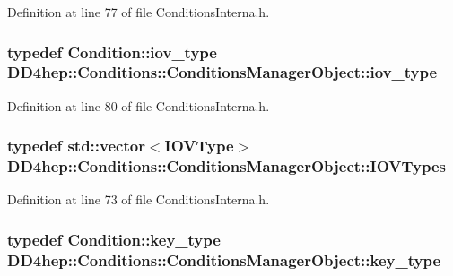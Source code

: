 Definition at line 77 of file ConditionsInterna.h.\hypertarget{class_d_d4hep_1_1_conditions_1_1_conditions_manager_object_a0190ec510ca46da4a1cc908ac3c3a1dd}{
\subsubsection[{iov\_\-type}]{\setlength{\rightskip}{0pt plus 5cm}typedef {\bf Condition::iov\_\-type} {\bf DD4hep::Conditions::ConditionsManagerObject::iov\_\-type}}}
\label{class_d_d4hep_1_1_conditions_1_1_conditions_manager_object_a0190ec510ca46da4a1cc908ac3c3a1dd}


Definition at line 80 of file ConditionsInterna.h.\hypertarget{class_d_d4hep_1_1_conditions_1_1_conditions_manager_object_a8c3b7d5bdfb7fc6bf6e61ddba5a5f652}{
\subsubsection[{IOVTypes}]{\setlength{\rightskip}{0pt plus 5cm}typedef std::vector$<${\bf IOVType}$>$ {\bf DD4hep::Conditions::ConditionsManagerObject::IOVTypes}}}
\label{class_d_d4hep_1_1_conditions_1_1_conditions_manager_object_a8c3b7d5bdfb7fc6bf6e61ddba5a5f652}


Definition at line 73 of file ConditionsInterna.h.\hypertarget{class_d_d4hep_1_1_conditions_1_1_conditions_manager_object_ac44eafc69174743e81d2f60e1f510719}{
\subsubsection[{key\_\-type}]{\setlength{\rightskip}{0pt plus 5cm}typedef {\bf Condition::key\_\-type} {\bf DD4hep::Conditions::ConditionsManagerObject::key\_\-type}}}
\label{class_d_d4hep_1_1_conditions_1_1_conditions_manager_object_ac44eafc69174743e81d2f60e1f510719}


